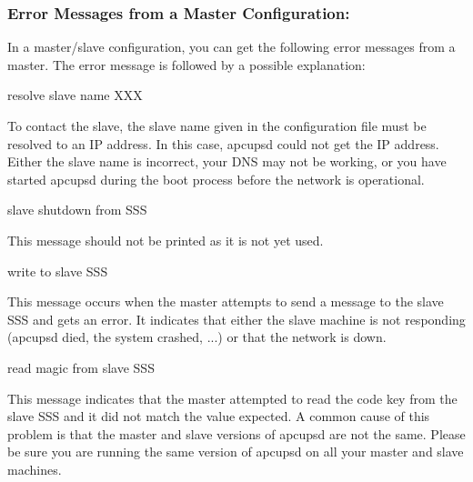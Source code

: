 {{{{{{{{{\label{Error-Messages-from-a-Master-Configuration}

\subsubsection*{Error Messages from a Master Configuration:}

In a master/slave configuration, you can get the following error messages from
a master. The error message is followed by a possible explanation: 

\label{Cannot-resolve-slave-name-XXX}

{\smallCannot resolve slave name XXX}

To contact the slave, the slave name given in the configuration file must be
resolved to an IP address. In this case, apcupsd could not get the IP address.
Either the slave name is incorrect, your DNS may not be working, or you have
started apcupsd during the boot process before the network is operational. 

\label{Got-slave-shutdown-from-SSS}

{\smallGot slave shutdown from SSS}

This message should not be printed as it is not yet used. 

\label{Cannot-write-to-slave-SSS}

{\smallCannot write to slave SSS}

This message occurs when the master attempts to send a message to the slave
SSS and gets an error. It indicates that either the slave machine is not
responding (apcupsd died, the system crashed, ...) or that the network is
down. 

\label{Cannot-read-magic-from-slave-SSS}

{\smallCannot read magic from slave SSS}

This message indicates that the master attempted to read the code key from the
slave SSS and it did not match the value expected. A common cause of this
problem is that the master and slave versions of apcupsd are not the same.
Please be sure you are running the same version of apcupsd on all your master
and slave machines. 

}}}}}}}}}
